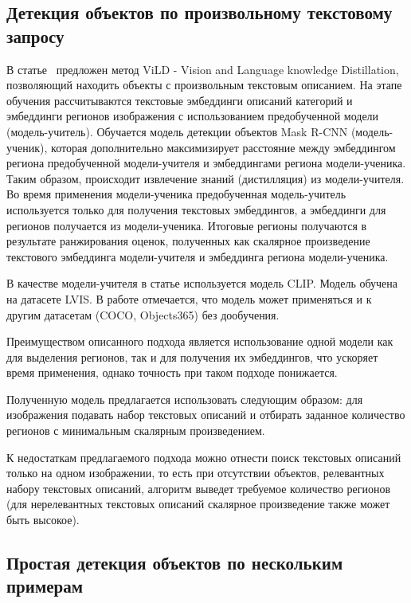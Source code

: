 \documentclass[a4paper,14pt]{article}
\begin{document}
    \subsection{Детекция объектов по произвольному текстовому запросу}

    В статье~\cite{ViLD} предложен метод ViLD - Vision and Language knowledge Distillation, позволяющий находить объекты с произвольным текстовым описанием.
    На этапе обучения рассчитываются текстовые эмбеддинги описаний категорий и эмбеддинги регионов изображения с использованием предобученной модели (модель-учитель).
    Обучается модель детекции объектов Mask R-CNN (модель-ученик), которая дополнительно максимизирует расстояние между эмбеддингом региона предобученной модели-учителя и эмбеддингами региона модели-ученика.
    Таким образом, происходит извлечение знаний (дистилляция) из модели-учителя.
    Во время применения модели-ученика предобученная модель-учитель используется только для получения текстовых эмбеддингов, а эмбеддинги для регионов получается из модели-ученика.
    Итоговые регионы получаются в результате ранжирования оценок, полученных как скалярное произведение текстового эмбеддинга модели-учителя и эмбеддинга региона модели-ученика.

    В качестве модели-учителя в статье используется модель CLIP.
    Модель обучена на датасете LVIS. 
    В работе отмечается, что модель может применяться и к другим датасетам (COCO, Objects365) без дообучения.

    Преимуществом описанного подхода является использование одной модели как для выделения регионов, так и для получения их эмбеддингов, что ускоряет время применения, однако точность при таком подходе понижается.

    Полученную модель предлагается использовать следующим образом: для изображения подавать набор текстовых описаний и отбирать заданное количество регионов с минимальным скалярным произведением.

    К недостаткам предлагаемого подхода можно отнести поиск текстовых описаний только на одном изображении, то есть при отсутствии объектов, релевантных набору текстовых описаний, алгоритм выведет требуемое количество регионов (для нерелевантных текстовых описаний скалярное произведение также может быть высокое).

    \subsection{Простая детекция объектов по нескольким примерам}
\end{document}
